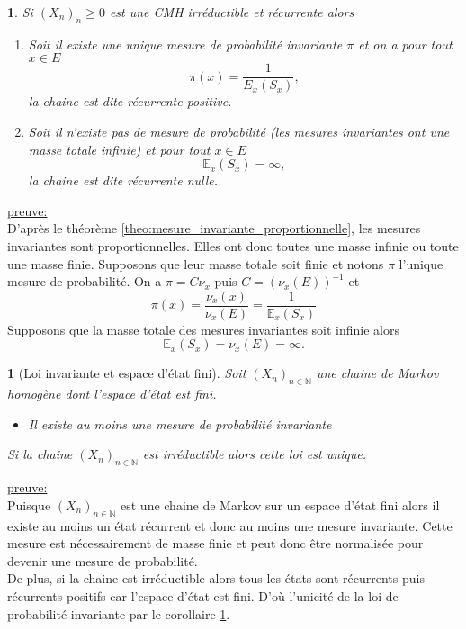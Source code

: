 \documentclass[8pt,notheorems]{beamer}
\def \E{\mathbb E}
\def \N{\mathbb N}
\newtheorem{corollary}{\translate{Corollaire}}
\newtheorem{prop}{\translate{Proposition}}
\theoremstyle{definition}
\theoremstyle{example}
\newtheorem{remark}{\translate{Remarque}}
\theoremstyle{mystyle}
\theoremstyle{plain}
\begin{document}
\begin{frame}[allowframebreaks]
\begin{corollary}\label{cor:loi_invariante_existence_unicite}
Si $(X_n)_n\geq 0$ est une CMH irréductible et récurrente alors
\begin{enumerate}
    \item Soit il existe une unique mesure de probabilité invariante $\pi$ et on a pour tout $x\in E$
    $$
    \pi(x) = \frac{1}{E_x(S_x)},
    $$
    la chaine est dite récurrente positive.
    \item Soit il n'existe pas de mesure de probabilité (les mesures invariantes ont une masse totale infinie) et pour tout $x\in E$
    $$
    \E_x(S_x) = \infty,
    $$
    la chaine est dite récurrente nulle.
\end{enumerate}
\end{corollary}
\underline{preuve:}\\
D'après le théorème \ref{theo:mesure_invariante_proportionnelle}, les mesures invariantes sont proportionnelles. Elles ont donc toutes une masse infinie ou toute une masse finie. Supposons que leur masse totale soit finie et notons $\pi$ l'unique mesure de probabilité. On a $\pi = C\nu_x$ puis $C = (\nu_x(E))^{-1}$ et
$$
\pi(x) = \frac{\nu_x(x)}{\nu_x(E)} = \frac{1}{\E_x(S_x)}
$$
Supposons que la masse totale des mesures invariantes soit infinie alors
$$
\E_x(S_x) = \nu_x(E) = \infty.
$$
\begin{prop}[Loi invariante et espace d'état fini]
Soit $(X_n)_{n\in\N}$ une chaine de Markov homogène dont l'espace d'état est fini.
\begin{itemize}
\item Il existe au moins une mesure de probabilité invariante
\end{itemize}
Si la chaine $(X_n)_{n\in\N}$ est irréductible alors cette loi est unique.
\end{prop}
\underline{preuve:}\\
Puisque $(X_n)_{n\in\N}$ est une chaine de Markov sur un espace d'état fini alors il existe au moins un état récurrent et donc au moins une mesure invariante. Cette mesure est nécessairement de masse finie et peut donc être normalisée pour devenir une mesure de probabilité.\\

De plus, si la chaine est irréductible alors tous les états sont récurrents puis récurrents positifs car l'espace d'état est fini. D'où l'unicité de la loi de probabilité invariante par le corollaire \ref{cor:loi_invariante_existence_unicite}.
\end{frame}
\end{document}
